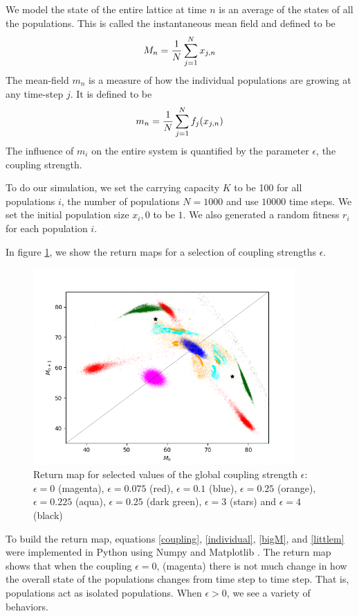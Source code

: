 \documentclass[conference]{IEEEtran}
\begin{document}
We model the state of the entire lattice at time $n$ is an average of the states of all the populations.  This is called the instantaneous mean field and defined to be
\begin{eqnarray}
M_n = { 1 \over N} \sum _{j=1}^N x_{j,n}
\label{bigM}
\end{eqnarray}
 The mean-field $m_n$ is a measure of how the individual populations are growing at any time-step $j$.  It is defined to be 
 \begin{eqnarray}
 m_n = {1 \over N} \sum_{j=1}^N f_j(x_{j,n})
 \label{littlem}
\end{eqnarray}
The influence of $m_i$ on the entire system is quantified by the parameter $\epsilon$, the coupling strength.  
 
To do our simulation,  we set the carrying capacity $K$ to be 100 for all populations $i$, the number of populations $N = 1000$ and use $10000$ time steps.   We set the initial population size $x_i, 0$ to be $1$.   We also generated a random fitness $r_i$ for each population $i$.   

In figure \ref{prettypicture}, we show the return maps for a selection of coupling strengths $\epsilon$.  

 \begin{figure}[H]
 \centering
    \includegraphics[width=100mm]{prettypicture}
    
    \caption{ Return map for selected values of  the global coupling strength $\epsilon$:  $\epsilon =0$ (magenta), $\epsilon = 0.075$ (red), $\epsilon = 0.1$ (blue), $\epsilon = 0.25$ (orange), $\epsilon = 0.225$ (aqua), $\epsilon = 0.25$ (dark green), $\epsilon = 3 $ (stars) and $\epsilon = 4$ (black)}
 \label{prettypicture}
\end{figure} 

To build the return map, equations \ref{coupling},  \ref{individual}, \ref{bigM},  and \ref{littlem} were implemented  in Python using Numpy \cite{numpy} and Matplotlib \cite{matplotlib}.   The return map shows that when the coupling $\epsilon = 0$,  (magenta) there is not much change in how the overall state of the populations changes from time step to time step.  That is, populations  act as isolated populations.   When $\epsilon > 0$, we see a variety of behaviors. 
\end{document}

